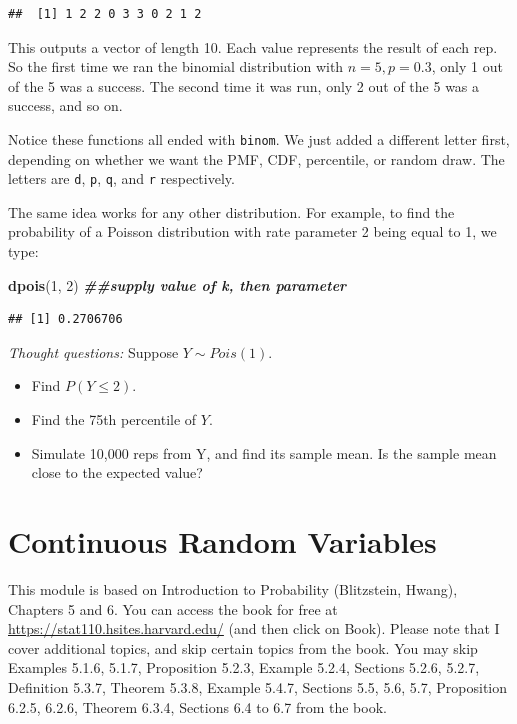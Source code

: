 \documentclass[
]{book}
\newenvironment{Shaded}{\begin{snugshade}}{\end{snugshade}}
\newcommand{\DecValTok}[1]{\textcolor[rgb]{0.00,0.00,0.81}{#1}}
\newcommand{\DocumentationTok}[1]{\textcolor[rgb]{0.56,0.35,0.01}{\textbf{\textit{#1}}}}
\newcommand{\FunctionTok}[1]{\textcolor[rgb]{0.13,0.29,0.53}{\textbf{#1}}}
\newcommand{\NormalTok}[1]{#1}
\providecommand{\tightlist}{%
  \setlength{\itemsep}{0pt}\setlength{\parskip}{0pt}}
\begin{document}
\begin{verbatim}
##  [1] 1 2 2 0 3 3 0 2 1 2
\end{verbatim}

This outputs a vector of length 10. Each value represents the result of each rep. So the first time we ran the binomial distribution with \(n=5, p=0.3\), only 1 out of the 5 was a success. The second time it was run, only 2 out of the 5 was a success, and so on.

Notice these functions all ended with \texttt{binom}. We just added a different letter first, depending on whether we want the PMF, CDF, percentile, or random draw. The letters are \texttt{d}, \texttt{p}, \texttt{q}, and \texttt{r} respectively.

The same idea works for any other distribution. For example, to find the probability of a Poisson distribution with rate parameter 2 being equal to 1, we type:

\begin{Shaded}
\begin{Highlighting}[]
\FunctionTok{dpois}\NormalTok{(}\DecValTok{1}\NormalTok{, }\DecValTok{2}\NormalTok{) }\DocumentationTok{\#\#supply value of k, then parameter}
\end{Highlighting}
\end{Shaded}

\begin{verbatim}
## [1] 0.2706706
\end{verbatim}

\emph{Thought questions:} Suppose \(Y \sim Pois(1)\).

\begin{itemize}
\tightlist
\item
  Find \(P(Y \leq 2)\).
\item
  Find the 75th percentile of \(Y\).
\item
  Simulate 10,000 reps from Y, and find its sample mean. Is the sample mean close to the expected value?
\end{itemize}

\hypertarget{continuous-random-variables}{%
\chapter{Continuous Random Variables}\label{continuous-random-variables}}

This module is based on Introduction to Probability (Blitzstein, Hwang), Chapters 5 and 6. You can access the book for free at \url{https://stat110.hsites.harvard.edu/} (and then click on Book). Please note that I cover additional topics, and skip certain topics from the book. You may skip Examples 5.1.6, 5.1.7, Proposition 5.2.3, Example 5.2.4, Sections 5.2.6, 5.2.7, Definition 5.3.7, Theorem 5.3.8, Example 5.4.7, Sections 5.5, 5.6, 5.7, Proposition 6.2.5, 6.2.6, Theorem 6.3.4, Sections 6.4 to 6.7 from the book.
\end{document}
